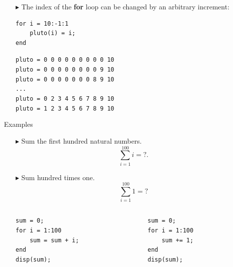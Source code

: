 \documentclass[aspectratio=169]{beamer}
\begin{document}
\begin{frame}[fragile]{}
    \begin{itemize}
        \item[$\blacktriangleright$]
        The index of the \textbf{for} loop can be changed by an \alert{arbitrary increment}:
        \begin{verbatim}
for i = 10:-1:1
    pluto(i) = i;
end
        \end{verbatim}
        \texttt{pluto = 0 0 0 0 0 0 0 0 0 10} \\
        \texttt{pluto = 0 0 0 0 0 0 0 0 9 10} \\
        \texttt{pluto = 0 0 0 0 0 0 0 8 9 10} \\
        \texttt{...} \\
        \texttt{pluto = 0 2 3 4 5 6 7 8 9 10} \\
        \texttt{pluto = 1 2 3 4 5 6 7 8 9 10}
    \end{itemize}
\end{frame}

\begin{frame}[fragile]{Examples}
    \begin{itemize}
        \item[$\blacktriangleright$]
        Sum the first hundred natural numbers.
        \begin{equation*}
            \sum_{i = 1}^{100} i = ?.
        \end{equation*}
        
        \item[$\blacktriangleright$]
        Sum hundred times one.
        \begin{equation*}
            \sum_{i=1}^{100} 1 = ?
        \end{equation*}
        
        \begin{columns}
            \begin{column}{0.5\textwidth}
                \begin{verbatim}
sum = 0;
for i = 1:100
    sum = sum + i;
end
disp(sum);
                \end{verbatim}
            \end{column}
            \begin{column}{0.5\textwidth}
                \begin{verbatim}
sum = 0;
for i = 1:100
    sum += 1;
end
disp(sum);
                \end{verbatim}
            \end{column}
        \end{columns}
    \end{itemize}
\end{frame}
\end{document}
